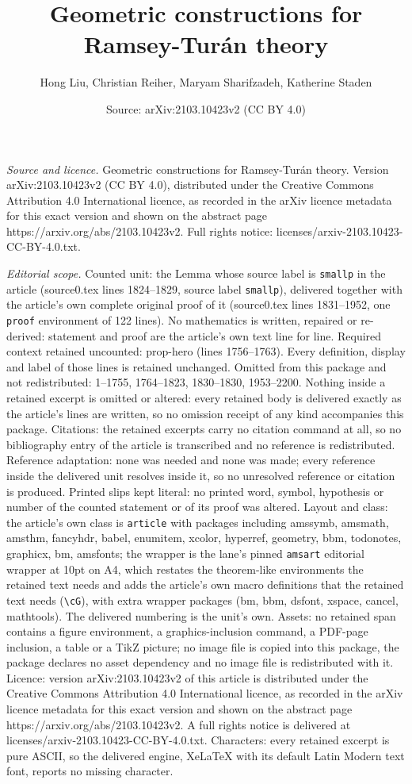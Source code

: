 \documentclass[10pt,a4paper]{amsart}
\title[Geometric constructions for Ramsey-Tur\'an theory]{Geometric constructions for Ramsey-Tur\'an theory}
\author{Hong Liu, Christian Reiher, Maryam Sharifzadeh, Katherine Staden}
\date{Source: arXiv:2103.10423v2 (CC BY 4.0)}
\begin{document}
\maketitle

\noindent\emph{Source and licence.} Geometric constructions for Ramsey-Tur\'an theory. Version arXiv:2103.10423v2 (CC BY 4.0), distributed under the Creative Commons Attribution 4.0 International licence, as recorded in the arXiv licence metadata for this exact version and shown on the abstract page https://arxiv.org/abs/2103.10423v2. Full rights notice: licenses/arxiv-2103.10423-CC-BY-4.0.txt.\par\smallskip

\noindent\textit{Editorial scope.} Counted unit: the Lemma whose source label is \texttt{smallp} in the article (source0.tex lines 1824--1829, source label \texttt{smallp}), delivered together with the article's own complete original proof of it (source0.tex lines 1831--1952, one \texttt{proof} environment of 122 lines). No mathematics is written, repaired or re-derived: statement and proof are the article's own text line for line. Required context retained uncounted: prop-hero (lines 1756--1763). Every definition, display and label of those lines is retained unchanged. Omitted from this package and not redistributed: 1--1755, 1764--1823, 1830--1830, 1953--2200. Nothing inside a retained excerpt is omitted or altered: every retained body is delivered exactly as the article's lines are written, so no omission receipt of any kind accompanies this package. Citations: the retained excerpts carry no citation command at all, so no bibliography entry of the article is transcribed and no reference is redistributed. Reference adaptation: none was needed and none was made; every reference inside the delivered unit resolves inside it, so no unresolved reference or citation is produced. Printed slips kept literal: no printed word, symbol, hypothesis or number of the counted statement or of its proof was altered. Layout and class: the article's own class is \texttt{article} with packages including amssymb, amsmath, amsthm, fancyhdr, babel, enumitem, xcolor, hyperref, geometry, bbm, todonotes, graphicx, bm, amsfonts; the wrapper is the lane's pinned \texttt{amsart} editorial wrapper at 10pt on A4, which restates the theorem-like environments the retained text needs and adds the article's own macro definitions that the retained text needs (\texttt{\textbackslash cG}), with extra wrapper packages (bm, bbm, dsfont, xspace, cancel, mathtools). The delivered numbering is the unit's own. Assets: no retained span contains a figure environment, a graphics-inclusion command, a PDF-page inclusion, a table or a TikZ picture; no image file is copied into this package, the package declares no asset dependency and no image file is redistributed with it. Licence: version arXiv:2103.10423v2 of this article is distributed under the Creative Commons Attribution 4.0 International licence, as recorded in the arXiv licence metadata for this exact version and shown on the abstract page https://arxiv.org/abs/2103.10423v2. A full rights notice is delivered at licenses/arxiv-2103.10423-CC-BY-4.0.txt. Characters: every retained excerpt is pure ASCII, so the delivered engine, XeLaTeX with its default Latin Modern text font, reports no missing character.
\end{document}
